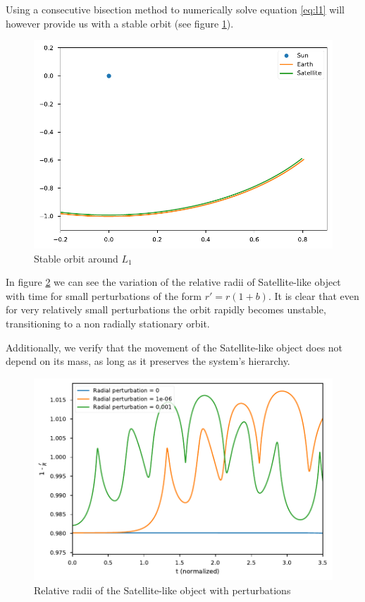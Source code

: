 \documentclass{aa}
\begin{document}
Using a consecutive bisection method to numerically solve equation \ref{eq:l1}
will however provide us with a stable orbit (see figure \ref{fig:l1_stable}).

\begin{figure}
  \centering
  \includegraphics[width=\linewidth]{figs/l1_stable.pdf}
  \caption{Stable orbit around $L_1$}
  \label{fig:l1_stable}
\end{figure}

In figure \ref{fig:l1_relative_r} we can see the variation of the relative radii
of Satellite-like object with time for small perturbations of the form $r' = r (1 + b)$. It is clear that
even for very relatively small perturbations the orbit rapidly becomes unstable,
transitioning to a non radially stationary orbit.

Additionally, we verify that the movement of the Satellite-like object does not
depend on its mass, as long as it preserves the system's hierarchy.

\begin{figure}
  \centering
  \includegraphics[width=\linewidth]{figs/l1_radius_perturbation.pdf}
  \caption{Relative radii of the Satellite-like object with perturbations}
  \label{fig:l1_relative_r}
\end{figure}
\end{document}

